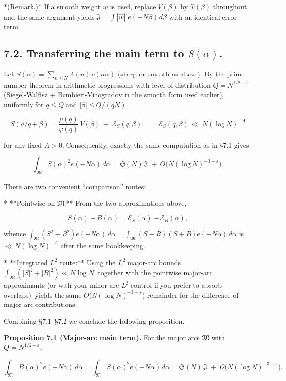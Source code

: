 \documentclass[11pt]{article}
\theoremstyle{definition}
\theoremstyle{remark}
\begin{document}
*(Remark.)* If a smooth weight $w$ is used, replace $V(\beta)$ by $\widehat w(\beta)$ throughout, and the same argument yields $\mathfrak J=\int|\widehat w|^2 e(-N\beta)\,d\beta$ with an identical error term.

\subsection*{7.2. Transferring the main term to $S(\alpha)$.}

Let $S(\alpha)=\sum_{n\le N}\Lambda(n)\,e(n\alpha)$ (sharp or smooth as above). By the prime number theorem in arithmetic progressions with level of distribution $Q=N^{1/2-\varepsilon}$ (Siegel-Walfisz + Bombieri-Vinogradov in the smooth form used earlier), uniformly for $q\le Q$ and $|\beta|\le Q/(qN)$,

$$
	S(a/q+\beta)=\frac{\mu(q)}{\varphi(q)}\,V(\beta) \;+\; \mathcal E_S(q,\beta),
	\qquad \mathcal E_S(q,\beta)\ \ll\ N(\log N)^{-A}
$$

for any fixed $A>0$. Consequently, exactly the same computation as in §7.1 gives

$$
	\int_{\mathfrak M} S(\alpha)^2 e(-N\alpha)\,d\alpha
	=\mathfrak S(N)\,\mathfrak J\;+\;O\!\big(N(\log N)^{-3-\varepsilon}\big).
$$

There are two convenient “comparison” routes:

* **Pointwise on $\mathfrak M$:** From the two approximations above,

$$
	S(\alpha)-B(\alpha)=\mathcal E_S(\alpha)-\mathcal E_B(\alpha),
$$

whence $\int_{\mathfrak M}(S^2-B^2)e(-N\alpha)\,d\alpha =\int_{\mathfrak M}(S-B)(S+B)e(-N\alpha)\,d\alpha$
is $\ll N(\log N)^{-A}$ after the same bookkeeping.

* **Integrated $L^2$ route:** Using the $L^2$ major-arc bounds $\int_{\mathfrak M}(|S|^2+|B|^2)\ll N\log N$, together with the pointwise major-arc approximants (or with your minor-arc $L^2$ control if you prefer to absorb overlaps), yields the same $O\big(N(\log N)^{-3-\varepsilon}\big)$ remainder for the difference of major-arc contributions.

Combining §7.1–§7.2 we conclude the following proposition.

\noindent\textbf{Proposition 7.1 (Major-arc main term).} For the major arcs $\mathfrak M$ with $Q=N^{1/2-\varepsilon}$,

$$
	\int_{\mathfrak M} B(\alpha)^2 e(-N\alpha)\,d\alpha
	=\int_{\mathfrak M} S(\alpha)^2 e(-N\alpha)\,d\alpha
	=\mathfrak S(N)\,\mathfrak J\;+\;O\!\big(N(\log N)^{-3-\varepsilon}\big).
$$
\end{document}
